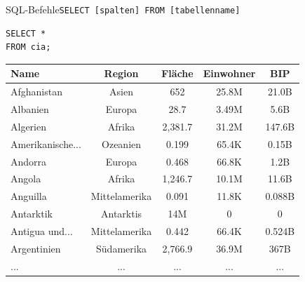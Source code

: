 \begin{frame}[fragile]{SQL-Befehle}{\lstinline|SELECT [spalten] FROM [tabellenname]|}
  \begin{lstlisting}
SELECT *
FROM cia;
\end{lstlisting}

  \begin{table}
    \centering
    \tiny
    \begin{tabular}{lcccc}
      \toprule
      \textbf{Name}    & \textbf{Region} & \textbf{Fläche} & \textbf{Einwohner} & \textbf{BIP} \\
      \midrule
      Afghanistan      & Asien           & 652             & 25.8M              & 21.0B        \\
      Albanien         & Europa          & 28.7            & 3.49M              & 5.6B         \\
      Algerien         & Afrika          & 2,381.7         & 31.2M              & 147.6B       \\
      Amerikanische... & Ozeanien        & 0.199           & 65.4K              & 0.15B        \\
      Andorra          & Europa          & 0.468           & 66.8K              & 1.2B         \\
      Angola           & Afrika          & 1,246.7         & 10.1M              & 11.6B        \\
      Anguilla         & Mittelamerika   & 0.091           & 11.8K              & 0.088B       \\
      Antarktik        & Antarktis       & 14M             & 0                  & 0            \\
      Antigua und...   & Mittelamerika   & 0.442           & 66.4K              & 0.524B       \\
      Argentinien      & Südamerika      & 2,766.9         & 36.9M              & 367B         \\
      \midrule
      ...              & ...             & ...             & ...                & ...          \\
      \bottomrule
    \end{tabular}
  \end{table}
\end{frame}

